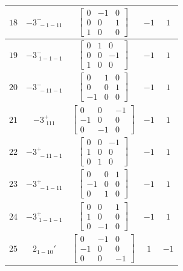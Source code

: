 \documentclass[fleqn,8pt]{jsarticle}
\begin{document}
\begin{longtable}{ccccc}
$ 18 $ & $ -3^{-}_{\,\,-1-11} $ & $ \begin{bmatrix} 0 & -1 & 0 \\ 0 & 0 & 1 \\ 1 & 0 & 0 \end{bmatrix} $ & $ -1 $ & $ 1 $ \\ \hline
$ 19 $ & $ -3^{-}_{\,\,1-1-1} $ & $ \begin{bmatrix} 0 & 1 & 0 \\ 0 & 0 & -1 \\ 1 & 0 & 0 \end{bmatrix} $ & $ -1 $ & $ 1 $ \\ \hline
$ 20 $ & $ -3^{-}_{\,\,-11-1} $ & $ \begin{bmatrix} 0 & 1 & 0 \\ 0 & 0 & 1 \\ -1 & 0 & 0 \end{bmatrix} $ & $ -1 $ & $ 1 $ \\ \hline
$ 21 $ & $ -3^{+}_{\,\,111} $ & $ \begin{bmatrix} 0 & 0 & -1 \\ -1 & 0 & 0 \\ 0 & -1 & 0 \end{bmatrix} $ & $ -1 $ & $ 1 $ \\ \hline
$ 22 $ & $ -3^{+}_{\,\,-11-1} $ & $ \begin{bmatrix} 0 & 0 & -1 \\ 1 & 0 & 0 \\ 0 & 1 & 0 \end{bmatrix} $ & $ -1 $ & $ 1 $ \\ \hline
$ 23 $ & $ -3^{+}_{\,\,-1-11} $ & $ \begin{bmatrix} 0 & 0 & 1 \\ -1 & 0 & 0 \\ 0 & 1 & 0 \end{bmatrix} $ & $ -1 $ & $ 1 $ \\ \hline
$ 24 $ & $ -3^{+}_{\,\,1-1-1} $ & $ \begin{bmatrix} 0 & 0 & 1 \\ 1 & 0 & 0 \\ 0 & -1 & 0 \end{bmatrix} $ & $ -1 $ & $ 1 $ \\ \hline
$ 25 $ & $ 2{}_{1-10}{}' $ & $ \begin{bmatrix} 0 & -1 & 0 \\ -1 & 0 & 0 \\ 0 & 0 & -1 \end{bmatrix} $ & $ 1 $ & $ -1 $ \\ \hline

\end{longtable}
\end{document}
